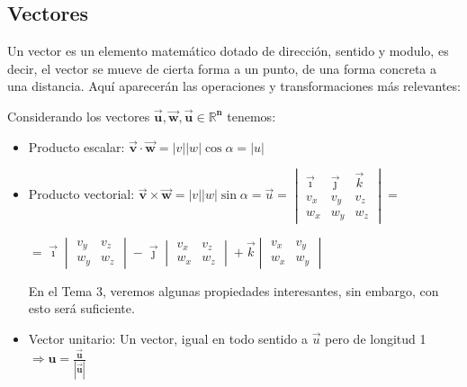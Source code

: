\subsection{Vectores}
\noindent Un vector es un elemento matemático dotado de dirección, sentido y modulo, es decir, el vector se mueve de cierta forma a un punto, de una forma concreta a una distancia.
Aquí aparecerán las operaciones y transformaciones más relevantes:


\vspace{0.5cm}
Considerando los vectores \(\bm{\vec{u},\vec{w}, \vec{u} \in \mathbb{R}^n}\) tenemos:


\vspace{0.3cm}
\begin{itemize}
        \item Producto escalar: \( \bm{\vec{v}\cdot \vec{w}} = \left\lvert v\right\rvert \left\lvert w\right\rvert \cos{\alpha } = \left\lvert u\right\rvert \)


        \item Producto vectorial: \(\bm{\vec{v}\times \vec{w}} = \left\lvert v\right\rvert \left\lvert w\right\rvert \sin{\alpha } = \vec{u} = \begin{vmatrix}
                      \vec{\imath} & \vec{\jmath} & \vec{k} \\
                      v_x          & v_y          & v_z     \\
                      w_x          & w_y          & w_z
              \end{vmatrix} =\) \par \hspace{1.5cm} \( = \vec{\imath}
              \begin{vmatrix}
                      v_y & v_z \\
                      w_y & w_z
              \end{vmatrix}
              -\vec{\jmath} \begin{vmatrix}
                      v_x & v_z \\
                      w_x & w_z
              \end{vmatrix}
              + \vec{k} \begin{vmatrix}
                      v_x & v_y \\
                      w_x & w_y
              \end{vmatrix}
              \) \par
              En el Tema 3, veremos algunas propiedades interesantes, sin embargo, con esto será suficiente.
        \item Vector unitario: Un vector, igual en todo sentido a \(\vec{u}\) pero de longitud 1 \(\Rightarrow  \bm{\hat{u} = \frac{\vec{u}}{\left | \vec{u} \right |}}\)
\end{itemize}
